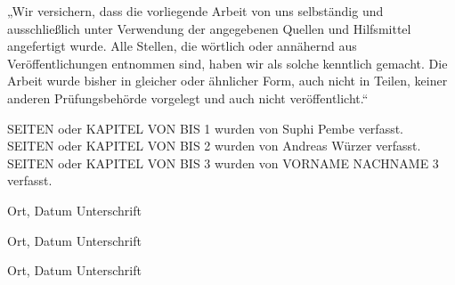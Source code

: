 \documentclass[12pt,toc=bib,toc=listof]{scrreprt}
\newcommand{\studentnameA}{Suphi Pembe}
\newcommand{\studentpartA}{SEITEN oder KAPITEL VON BIS 1}
\newcommand{\studentnameB}{Andreas Würzer}
\newcommand{\studentpartB}{SEITEN oder KAPITEL VON BIS 2}
\newcommand{\studentnameC}{VORNAME NACHNAME 3}
\newcommand{\studentpartC}{SEITEN oder KAPITEL VON BIS 3}
\begin{document}
\label{sec:erklaerung}

„Wir versichern, dass die vorliegende Arbeit von uns selbständig und ausschließlich unter Verwendung der angegebenen Quellen und Hilfsmittel angefertigt wurde. Alle Stellen, die wörtlich oder annähernd aus Veröffentlichungen entnommen sind, haben wir als solche kenntlich gemacht. Die Arbeit wurde bisher in gleicher oder ähnlicher Form, auch nicht in Teilen, keiner anderen Prüfungsbehörde vorgelegt und auch nicht veröffentlicht.“

\vspace{1cm}
\noindent
{\studentpartA} wurden von {\studentnameA} verfasst.
\\
{\studentpartB} wurden von {\studentnameB} verfasst.
\\
{\studentpartC} wurden von {\studentnameC} verfasst.

\vspace{3cm}
Ort, Datum \hfill Unterschrift

\vspace{2cm}
Ort, Datum \hfill Unterschrift

\vspace{2cm}
Ort, Datum \hfill Unterschrift
\end{document}
